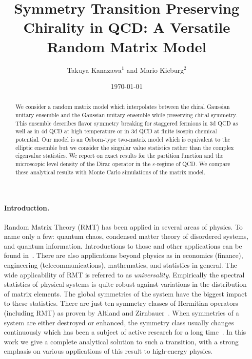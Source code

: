 \documentclass[aps,prl,reprint,graphicx,showpacs]{revtex4-1}
\renewcommand{\epsilon}{\varepsilon}
\begin{document}
\title{Symmetry Transition Preserving Chirality in QCD: A Versatile Random Matrix Model}

\author{Takuya Kanazawa$^{1}$ and Mario Kieburg$^{2}$}


\newcommand{\referee}[1]{{ #1}}
\newcommand{\we}[1]{{\color{blue}#1}}

\date{\today}

\begin{abstract}
We consider a random matrix model which interpolates between the chiral Gaussian unitary ensemble and the Gaussian unitary ensemble while preserving chiral symmetry. This ensemble describes flavor symmetry breaking for staggered fermions in 3d QCD as well as in 4d QCD at high temperature or in 3d QCD at finite isospin chemical potential. Our model is an Osborn-type two-matrix model which is equivalent to the elliptic ensemble but we consider the singular value statistics rather than the complex eigenvalue statistics. We report on exact results for the partition function and the microscopic level density of the Dirac operator in the $\epsilon$-regime of QCD. We compare these analytical results with Monte Carlo simulations of the matrix model.
\end{abstract}


\maketitle 
 
\paragraph{Introduction.}

{  Random Matrix Theory (RMT) has been applied in several areas of physics. To name only a few: quantum chaos, condensed matter theory of disordered systems, and quantum information. Introductions to those and other applications can be found in~\cite{handbook:2010}. There are also applications beyond physics as in economics (finance), engineering (telecommunications), mathematics, and statistics in general. The wide applicability of RMT is referred to as \textit{universality}.
  Empirically the spectral statistics of physical systems is quite robust
  against variations in the distribution of matrix elements. The global symmetries of the system have the biggest impact to these statistics. There are just ten symmetry classes of Hermitian operators (including RMT) as proven by Altland
  and Zirnbauer~\cite{AltZirn}. When symmetries of a system are either destroyed or
  enhanced, the symmetry class usually changes continuously which has been a subject of active research for a long time~\cite{Mehta_book}. In this work we give a complete analytical solution
  to such a transition, with a strong emphasis on various applications of this result
  to high-energy physics.}
\end{document}
